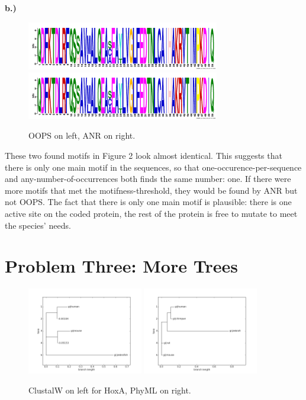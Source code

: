 \documentclass[10pt]{article} %
\begin{document}
\textbf{b.)}

\begin{figure}[h!]
  \centering
  \includegraphics[width=0.75\textwidth]{oops-logo.png}\\
  \includegraphics[width=0.75\textwidth]{anr-logo.png}
  \caption{OOPS on left, ANR on right.}
\end{figure}

These two found motifs in Figure 2 look almost identical. This suggests that there is only one
main motif in the sequences, so that one-occurence-per-sequence and any-number-of-occurrences
both finds the same number: one. If there were more motifs that met the motifness-threshold,
they would be found by ANR but not OOPS. The fact that there is only one main motif is plausible:
there is one active site on the coded protein, the rest of the protein is free to mutate to meet
the species' needs.\\

\section{Problem Three: More Trees}

\begin{figure}[h!]
  \centering
  \includegraphics[width=0.45\textwidth]{clustalw.png}
  \includegraphics[width=0.45\textwidth]{phyml.png}
  \caption{ClustalW on left for HoxA, PhyML on right.}
\end{figure}
\end{document}
